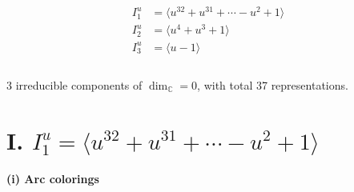 \documentclass[1p]{elsarticle_modified}
\theoremstyle{definition}
\begin{document}
\begin{align*}
I^u_{1}&=\langle 
u^{32}+u^{31}+\cdots- u^2+1\rangle \\
I^u_{2}&=\langle 
u^4+u^3+1\rangle \\
I^u_{3}&=\langle 
u-1\rangle \\
\\
\end{align*}
\raggedright * 3 irreducible components of $\dim_{\mathbb{C}}=0$, with total 37 representations.\\
\newpage
\renewcommand{\arraystretch}{1}
\centering \section*{I. $I^u_{1}= \langle u^{32}+u^{31}+\cdots- u^2+1 \rangle$}
\flushleft \textbf{(i) Arc colorings}\\
\end{document}
